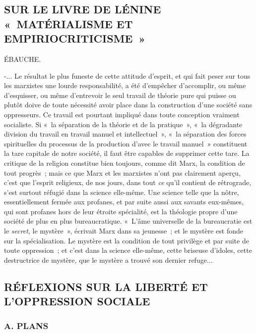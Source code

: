 \documentclass[french,twoside]{book} %
\begin{document}
\subsection[{SUR LE LIVRE DE LÉNINE « MATÉRIALISME ET EMPIRIOCRITICISME »}]{SUR LE LIVRE DE LÉNINE « MATÉRIALISME ET EMPIRIOCRITICISME »}

\begin{center}
\noindent \centerline{ÉBAUCHE.}\par
\end{center}

 -... Le résultat le plus funeste de cette attitude d'esprit, et qui fait peser sur tous les marxistes une lourde responsabilité, a été d'empêcher d'accomplir, ou même d'esquisser, ou même d'entrevoir le seul travail de théorie pure qui puisse ou plutôt doive de toute nécessité avoir place dans la construction d'une société sans oppresseurs. Ce travail est pourtant impliqué dans toute conception vraiment socialiste. Si « la séparation de la théorie et de la pratique », « la dégradante division du travail en travail manuel et intellectuel », « la séparation des forces spirituelles du processus de la production d'avec le travail manuel » constituent la tare capitale de notre société, il faut être capables de supprimer cette tare. La critique de la religion constitue bien toujours, comme dit Marx, la condition de tout progrès ; mais ce que Marx et les marxistes n'ont pas clairement aperçu, c'est que l'esprit religieux, de nos jours, dans tout {\itshape ce} qu'il contient de rétrograde, s'est surtout réfugié dans la science elle-même. Une science telle que la nôtre, essentiellement fermée aux profanes, et par suite aussi aux savants eux-mêmes, qui sont profanes hors de leur étroite spécialité, est la théologie propre d'une société de plus en plus bureaucratique. « L'âme universelle de la bureaucratie est le {\itshape secret}, le mystère », écrivait Marx dans sa jeunesse ; et le mystère est fonde sur la spécialisation. Le mystère est la condition de tout privilège et par suite de toute oppression ; et c’est dans la science elle-même, cette briseuse d'idoles, cette destructrice de mystère, que le mystère a trouvé son dernier refuge...
\subsection[{RÉFLEXIONS SUR LA LIBERTÉ ET L'OPPRESSION SOCIALE}]{RÉFLEXIONS SUR LA LIBERTÉ ET L'OPPRESSION SOCIALE}
\subsubsection[{A. PLANS}]{A. PLANS}
\end{document}
